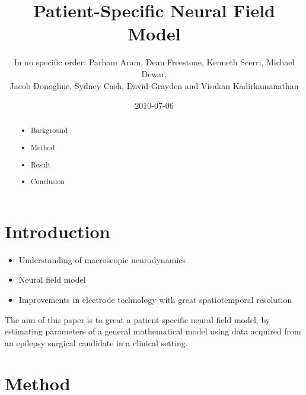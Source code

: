 \documentclass[]{article}
\title{Patient-Specific Neural Field Model}
\author{In no specific order: Parham Aram, Dean Freestone, Kenneth Scerri, Michael Dewar,\\
 Jacob Donoghue, Sydney Cash, David Grayden and Visakan Kadirkamanathan  }
\date{2010-07-06}
\begin{document}
\ifpdf
{}
\else
{}
\fi

\maketitle


\begin{abstract}
	
	\begin{itemize}
		\item Background
		\item Method
		\item Result
		\item Conclusion
	\end{itemize}
\end{abstract}

\section{Introduction}
\begin{itemize}
	\item Understanding of macroscopic neurodynamics
	\item Neural field model
	\item Improvements in electrode technology with great spatiotemporal resolution
\end{itemize}
The aim of this paper is to great a patient-specific neural field model, by estimating parameters of a general mathematical model using data acquired from an epilepsy surgical candidate in a clinical setting. 
\section{Method}
\end{document}
